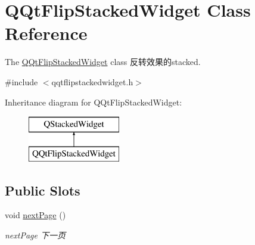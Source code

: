 \hypertarget{class_q_qt_flip_stacked_widget}{}\section{Q\+Qt\+Flip\+Stacked\+Widget Class Reference}
\label{class_q_qt_flip_stacked_widget}


The \mbox{\hyperlink{class_q_qt_flip_stacked_widget}{Q\+Qt\+Flip\+Stacked\+Widget}} class 反转效果的stacked.  




{\ttfamily \#include $<$qqtflipstackedwidget.\+h$>$}

Inheritance diagram for Q\+Qt\+Flip\+Stacked\+Widget\+:\begin{figure}[H]
\begin{center}
\leavevmode
\includegraphics[height=2.000000cm]{class_q_qt_flip_stacked_widget}
\end{center}
\end{figure}
\subsection*{Public Slots}
\begin{DoxyCompactItemize}
\item 
\mbox{\label{class_q_qt_flip_stacked_widget_afee3abe64fb9d447ac2764e24ad097cf}} 
void \mbox{\hyperlink{class_q_qt_flip_stacked_widget_afee3abe64fb9d447ac2764e24ad097cf}{next\+Page}} ()
\begin{DoxyCompactList}\small\item\em next\+Page 下一页 \end{DoxyCompactList}\end{DoxyCompactItemize}
